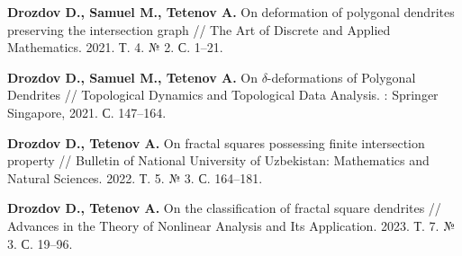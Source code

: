 \begin{thebibliography}{99}






%
    
    
\bigskip \bigskip


\bigskip \bigskip

{\bf Drozdov D., Samuel M., Tetenov A.}
On deformation of polygonal dendrites preserving the intersection graph //
The Art of Discrete and Applied Mathematics. 2021. Т. 4. № 2. С. 1--21.

{\bf Drozdov D., Samuel M., Tetenov A.} 
On $\delta$-deformations of Polygonal Dendrites // 
Topological Dynamics and Topological Data Analysis. : Springer Singapore, 2021. С. 147--164.

{\bf Drozdov D., Tetenov A.} 
On fractal squares possessing finite intersection property // 
Bulletin of National University of Uzbekistan: Mathematics and Natural Sciences. 2022. Т. 5. № 3. С. 164--181.

{\bf Drozdov D., Tetenov A.} 
On the classification of fractal square dendrites // 
Advances in the Theory of Nonlinear Analysis and Its Application. 2023. Т. 7. № 3. С. 19--96.




\end{thebibliography}
